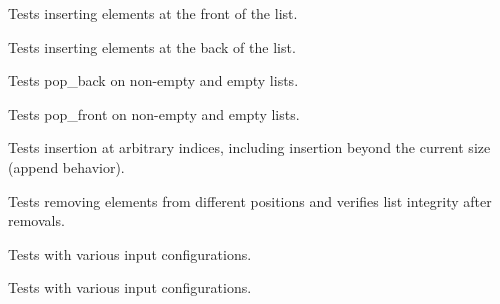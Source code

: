 \begin{DoxyRefList}
\item[Member \doxylink{linked__list__test_8cpp_ac4443829f26b62460ab7798e65fe26d4}{TEST} (linked\+\_\+list, push\+\_\+front)]\label{test__test000009}%
%
Tests inserting elements at the front of the list.  
\item[Member \doxylink{linked__list__test_8cpp_ad7f286097bc9b97fbc2fd80bd38285bd}{TEST} (linked\+\_\+list, push\+\_\+back)]\label{test__test000010}%
%
Tests inserting elements at the back of the list.  
\item[Member \doxylink{linked__list__test_8cpp_ab8014ce898f5c9858d12f2625c5466bf}{TEST} (linked\+\_\+list, pop\+\_\+back)]\label{test__test000011}%
%
Tests pop\+\_\+back on non-\/empty and empty lists.  
\item[Member \doxylink{linked__list__test_8cpp_a28580da46b374fb21057e28c59297cd5}{TEST} (linked\+\_\+list, pop\+\_\+front)]\label{test__test000012}%
%
Tests pop\+\_\+front on non-\/empty and empty lists.  
\item[Member \doxylink{linked__list__test_8cpp_a5c5d11d14f160da84932b18ba5dd6bd9}{TEST} (linked\+\_\+list, insert)]\label{test__test000013}%
%
Tests insertion at arbitrary indices, including insertion beyond the current size (append behavior).  
\item[Member \doxylink{linked__list__test_8cpp_afc5d850e9940b0e4848916994d3f34c0}{TEST} (linked\+\_\+list, remove)]\label{test__test000014}%
%
Tests removing elements from different positions and verifies list integrity after removals.  
\item[Member \doxylink{merge__sort__test_8cpp_a6e234624997000ecfa9fe964819d905a}{TEST} (sort, merge\+\_\+sort)]\label{test__test000015}%
%
Tests  with various input configurations.  
\item[Member \doxylink{quick__sort__test_8cpp_afc5e0b21018b21186f3f2e543a6d7ff6}{TEST} (sort, quick\+\_\+sort)]\label{test__test000016}%
%
Tests  with various input configurations. 
\end{DoxyRefList}